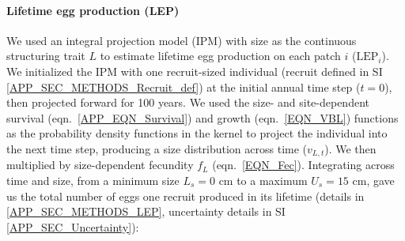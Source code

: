 \documentclass[12pt, oneside]{article}   	%
\begin{document}




\paragraph*{Lifetime egg production (LEP)}

We used an integral projection model (IPM) \citep{ellner2016data} with size as the continuous structuring trait $L$ to estimate lifetime egg production on each patch $i$ ($\text{LEP}_i$). We initialized the IPM with one recruit-sized individual (recruit defined in SI \ref{APP_SEC_METHODS_Recruit_def}) at the initial annual time step ($t=0$), then projected forward for 100 years. We used the size- and site-dependent survival (eqn.\ \ref{APP_EQN_Survival}) and growth (eqn.\ \ref{EQN_VBL}) functions as the probability density functions in the kernel to project the individual into the next time step, producing a size distribution across time ($v_{L,t}$). We then multiplied by size-dependent fecundity $f_L$ (eqn.\ \ref{EQN_Fec}). Integrating across time and size, from a minimum size $L_s=0$ cm to a maximum $U_s=15$ cm, gave us the total number of eggs one recruit produced in its lifetime (details in \ref{APP_SEC_METHODS_LEP}, uncertainty details in SI \ref{APP_SEC_Uncertainty}):
\end{document}
